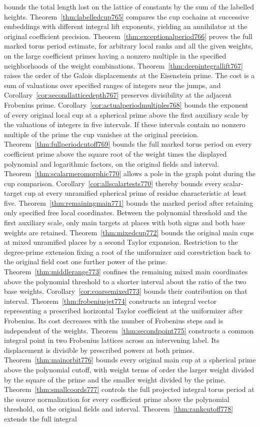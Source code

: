 \documentclass[a4paper,11pt]{article}
\theoremstyle{definition}
\theoremstyle{remark}
\numberwithin{equation}{section}
\begin{document}
bounds the total length lost on the lattice of constants by the sum of the labelled heights. Theorem~\ref{thm:labelledcup765} compares the cup cochains at successive embeddings with different integral lift exponents, yielding an annihilator at the original coefficient precision. Theorem~\ref{thm:exceptionalperiod766} proves the full marked torus period estimate, for arbitrary local ranks and all the given weights, on the large coefficient primes having a nonzero multiple in the specified neighborhoods of the weight combinations. Theorem~\ref{thm:deepintegrallift767} raises the order of the Galois displacements at the Eisenstein prime. The cost is a sum of valuations over specified ranges of integers near the jumps, and Corollary~\ref{cor:secondlatticedepth767} preserves divisibility at the adjacent Frobenius prime. Corollary~\ref{cor:actualperiodmultiples768} bounds the exponent of every original local cup at a spherical prime above the first auxiliary scale by the valuations of integers in five intervals. If these intervals contain no nonzero multiple of the prime the cup vanishes at the original precision. Theorem~\ref{thm:fullperiodcutoff769} bounds the full marked torus period on every coefficient prime above the square root of the weight times the displayed polynomial and logarithmic factors, on the original fields and interval. Theorem~\ref{thm:scalarmeromorphic770} allows a pole in the graph point during the cup comparison. Corollary~\ref{cor:allscalartests770} thereby bounds every scalar-target cup at every unramified spherical prime of residue characteristic at least five. Theorem~\ref{thm:remainingmain771} bounds the marked period after retaining only specified free local coordinates. Between the polynomial threshold and the first auxiliary scale, only main targets at places with both signs and both base weights are retained. Theorem~\ref{thm:mixedcup772} bounds the original main cups at mixed unramified places by a second Taylor expansion. Restriction to the degree-prime extension fixing a root of the uniformizer and corestriction back to the original field cost one further power of the prime. Theorem~\ref{thm:middlerange773} confines the remaining mixed main coordinates above the polynomial threshold to a shorter interval about the ratio of the two base weights. Corollary~\ref{cor:coarsemixed773} bounds their contribution on that interval. Theorem~\ref{thm:frobeniusjet774} constructs an integral vector representing a prescribed horizontal Taylor coefficient at the uniformizer after Frobenius. Its cost decreases with the number of Frobenius steps and is independent of the weights. Theorem~\ref{thm:secondpoint775} constructs a common integral point in two Frobenius lattices across an intervening label. Its displacement is divisible by prescribed powers at both primes. Theorem~\ref{thm:mainorbit776} bounds every original main cup at a spherical prime above the polynomial cutoff, with weight terms of order the larger weight divided by the square of the prime and the smaller weight divided by the prime. Theorem~\ref{thm:smallcoords777} controls the full projected integral torus period at the source normalization for every coefficient prime above the polynomial threshold, on the original fields and interval. Theorem~\ref{thm:rankcutoff778} extends the full integral 
\end{document}
